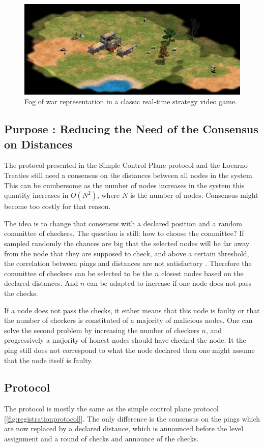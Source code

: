 \documentclass[a4paper,11pt,oneside]{report}
\begin{document}
\begin{figure}[!h] 
\centering
\includegraphics[width=400pt]{figures/fog_of_war}
\caption{Fog of war representation in a classic real-time strategy video game. }
\label{fig:fog-of-the-war}
\end{figure}

\subsection{Purpose : Reducing the Need of the Consensus on Distances}
The protocol presented in the Simple Control Plane protocol and the Locarno
Treaties still need a consensus on the distances between all nodes in the system.
This can be cumbersome as the number of nodes increases in the system this
quantity increases in $O(N^2)$, where $N$ is the number of nodes. Consensus
might become too costly for that reason.

The idea is to change that consensus with a declared position and a random
committee of checkers. The question is still: how to choose the committee? If
sampled randomly the chances are big that the selected nodes will be far away
from the node that they are supposed to check, and above a certain threshold, the correlation between pings
and distances are not satisfactory \cite{Katz-bassett2006}. Therefore the committee of checkers can be
selected to be the $n$ closest nodes based on the declared distances. And $n$
can be adapted to increase if one node does not pass the checks. 

If a node does not pass the checks, it either means that this node is faulty or
that the number of checkers is constituted of a majority of malicious nodes.
One can solve the second problem by increasing the number of checkers $n$, and
progressively a majority of honest nodes should have checked the node. It the
ping still does not correspond to what the node declared then one might assume
that the node itself is faulty. 

\subsection{Protocol}
The protocol is mostly the same as the simple control plane protocol
[\autoref{fig:registrationprotocol}]. The only difference is the consensus on
the pings which are now replaced by a declared distance, which is announced
before the level assignment and a round of checks and announce of the checks. 
\end{document}

